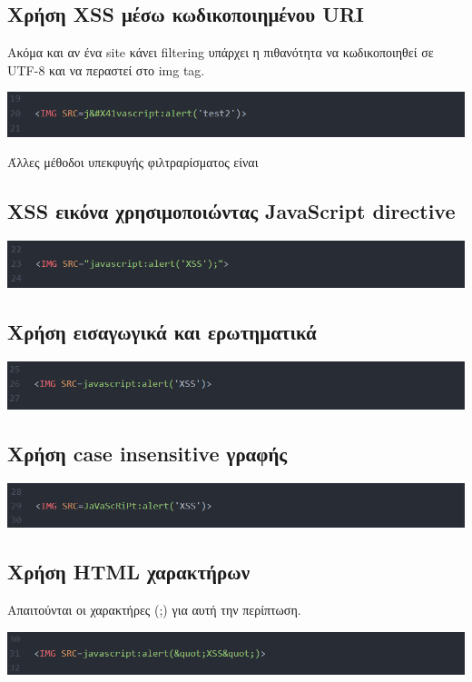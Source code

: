 \subsection{Χρήση XSS μέσω κωδικοποιημένου URI}
\noindent
Ακόμα και αν ένα site κάνει filtering υπάρχει η πιθανότητα να κωδικοποιηθεί σε UTF-8 και να περαστεί στο img tag.
\begin{center}
			\includegraphics[width=1\textwidth]{image/5.PNG}		
\end{center}
\noindent
Άλλες μέθοδοι υπεκφυγής φιλτραρίσματος είναι
\subsection{XSS εικόνα χρησιμοποιώντας JavaScript directive}
\begin{center}
			\includegraphics[width=1\textwidth]{image/6.PNG}		
\end{center}
\subsection{Χρήση εισαγωγικά και ερωτηματικά}
\begin{center}
			\includegraphics[width=1\textwidth]{image/7.PNG}		
\end{center}
\subsection{Χρήση case insensitive γραφής}
\begin{center}
			\includegraphics[width=1\textwidth]{image/8.PNG}		
\end{center}
\subsection{Χρήση HTML χαρακτήρων}
\noindent
Απαιτούνται οι χαρακτήρες (;) για αυτή την περίπτωση.
\begin{center}
			\includegraphics[width=1\textwidth]{image/10.PNG}		
\end{center}
